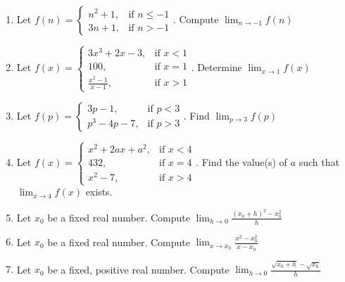 \documentclass[12pt]{article}
\newif\ifans
\begin{document}
\begin{enumerate}
\ifans{\fbox{$\displaystyle \frac{1}{4}$}} \fi

\item Let $\displaystyle 
      f(n) = \begin{cases}
      n^2+1, & \text{if }n \leq -1 \\
      3n+1, & \text{if }n > -1 \end{cases}$. Compute $\displaystyle \lim_{n\rightarrow -1}{f(n)}$

\ifans{\fbox{DNE}} \fi

\item Let $\displaystyle 
        f(x) = \begin{cases}
        3x^3+2x-3, & \text{if }x < 1   \\
        100, & \text{if }x = 1 \\
        \frac{x^2-1}{x-1}, & \text{if }x > 1 \end{cases}$. Determine $\displaystyle \lim_{x\rightarrow 1}{f(x)}$ 

\ifans{\fbox{2}} \fi

\item Let $\displaystyle f(p) = \begin{cases} 
        3p-1, & \text{if } p<3 \\
        p^3-4p-7, & \text{if } p>3 \end{cases}$. Find $\displaystyle \lim_{p\rightarrow 3}{f(p)}$

\ifans{\fbox{8}} \fi

\item Let $f(x) = \begin{cases}
        x^2+2ax+a^2, & \text{if } x < 4 \\
        432, & \text{if } x = 4 \\
        x^2 -7, & \text{if } x > 4 \end{cases}$. Find the value(s) of $a$ such that $\displaystyle \lim_{x\rightarrow 4}{f(x)}$ exists. 

\ifans{\fbox{$-1$ or $-7$}} \fi

\item Let $x_0$ be a fixed real number.  Compute $\displaystyle \lim_{h \rightarrow 0}{\frac{(x_0+h)^2-x_0^2}{h}}$

\ifans{\fbox{$2x_0$}} \fi

\item Let $x_0$ be a fixed real number.  Compute $\displaystyle \lim_{x \rightarrow x_0}{\frac{x^2-x_0^2}{x-x_0}}$

\ifans{\fbox{$2x_0$}} \fi

\item Let $x_0$ be a fixed, positive real number.  Compute $\displaystyle \lim_{h \rightarrow 0}{\frac{\sqrt{x_0+h}-\sqrt{x_0}}{h}}$

\ifans{\fbox{$\displaystyle \frac{1}{2\sqrt{x_0}}$}} \fi

\end{enumerate}
\end{document}
